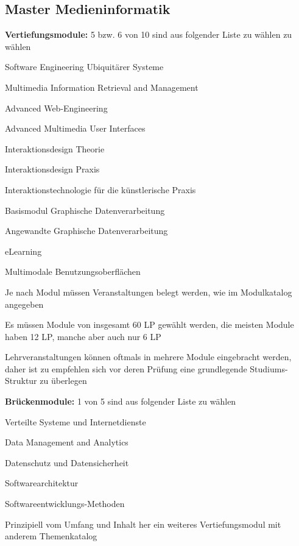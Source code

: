 \documentclass[a4paper,12pt]{report}
\begin{document}
\subsection{Master Medieninformatik}
\begin{itemize*}
	\item \textbf{Vertiefungsmodule:} 5 bzw. 6 von 10 sind aus folgender Liste zu wählen zu wählen
	\begin{itemize*}
		\item Software Engineering Ubiquitärer Systeme
		\item Multimedia Information Retrieval and Management
		\item Advanced Web-Engineering
		\item Advanced Multimedia User Interfaces
		\item Interaktionsdesign Theorie
		\item Interaktionsdesign Praxis
		\item Interaktionstechnologie für die künstlerische Praxis
		\item Basismodul Graphische Datenverarbeitung
		\item Angewandte Graphische Datenverarbeitung
		\item eLearning
		\item Multimodale Benutzungsoberflächen
	\end{itemize*}
	\item Je nach Modul müssen Veranstaltungen belegt werden, wie im Modulkatalog angegeben
	\item Es müssen Module von insgesamt 60 LP gewählt werden, die meisten Module haben 12 LP, manche aber auch nur 6 LP
	\item Lehrveranstaltungen können oftmals in mehrere Module eingebracht werden, daher ist zu empfehlen sich vor deren Prüfung eine grundlegende Studiums-Struktur zu überlegen
	\item \textbf{Brückenmodule:} 1 von 5 sind aus folgender Liste zu wählen
	\begin{itemize*}
		\item Verteilte Systeme und Internetdienste
		\item Data Management and Analytics
		\item Datenschutz und Datensicherheit
		\item Softwarearchitektur
		\item Softwareentwicklungs-Methoden
	\end{itemize*}
	\item Prinzipiell vom Umfang und Inhalt her ein weiteres Vertiefungsmodul mit anderem Themenkatalog

\end{itemize*}
\end{document}

